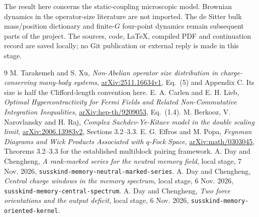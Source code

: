 \documentclass[11pt]{article}
\begin{document}
The result here concerns the static-coupling microscopic model.
Brownian dynamics in the operator-size literature are not imported.
The de Sitter bulk mass/position dictionary and finite-$G$ four-point
dynamics remain subsequent parts of the project. The sources, code,
LaTeX, compiled PDF and continuation record are saved locally;
no Git publication or external reply is made in this stage.

\newpage
\begin{thebibliography}{9}\small
{} M. Tarakemeh and S. Xu, \emph{Non-Abelian operator size
distribution in charge-conserving many-body systems},
\href{https://arxiv.org/abs/2511.16634}{arXiv:2511.16634v1}, Eq.\ (5)
and Appendix C. Its size is half the Clifford-length convention here.
 E. A. Carlen and E. H. Lieb, \emph{Optimal Hypercontractivity
for Fermi Fields and Related Non-Commutative Integration Inequalities},
\href{https://arxiv.org/abs/hep-th/9209053}{arXiv:hep-th/9209053}, Eq.\ (1.4).
 M. Berkooz, V. Narovlansky and H. Raj,
\emph{Complex Sachdev-Ye-Kitaev model in the double scaling limit},
\href{https://arxiv.org/abs/2006.13983}{arXiv:2006.13983v2},
Sections 3.2--3.3.
 E. G. Effros and M. Popa, \emph{Feynman Diagrams and Wick
Products Associated with $q$-Fock Space},
\href{https://arxiv.org/abs/math/0303045}{arXiv:math/0303045},
Theorems 3.2--3.3 for the established multiblock pairing framework.
 A. Day and Chengheng, \emph{A rank-marked series for the
neutral memory field}, local stage, 7 Nov. 2026,
\texttt{susskind-memory-neutral-marked-series}.
 A. Day and Chengheng, \emph{Central charge windows in
the memory spectrum}, local stage, 6 Nov. 2026,
\texttt{susskind-memory-central-spectrum}.
 A. Day and Chengheng, \emph{Two force orientations and
the output deficit}, local stage, 6 Nov. 2026,
\texttt{susskind-memory-oriented-kernel}.
\end{thebibliography}
\end{document}
